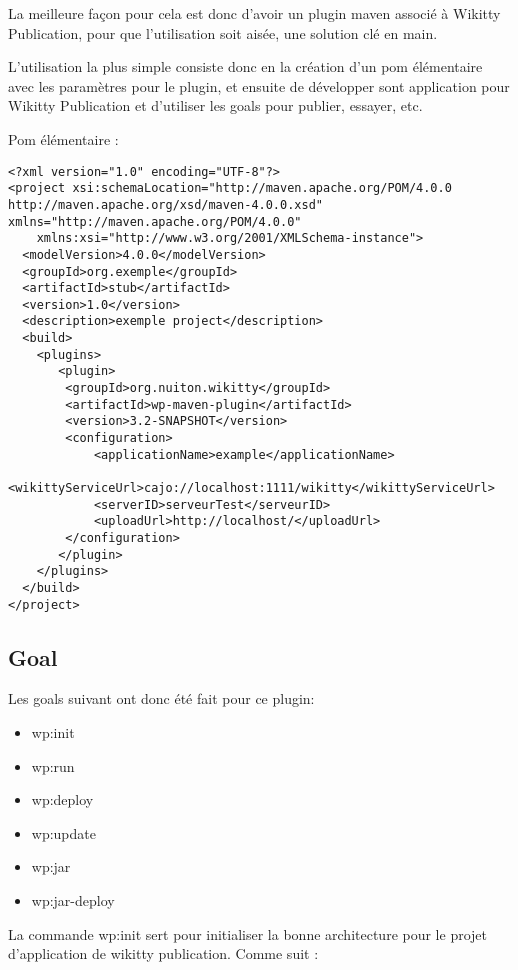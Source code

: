 La meilleure façon pour cela est donc d'avoir un plugin maven associé à 
Wikitty Publication, pour que l'utilisation soit aisée, une solution clé en 
main.

L'utilisation la plus simple consiste donc en la création d'un pom élémentaire
avec les paramètres pour le plugin, et ensuite de développer sont application
pour Wikitty Publication et d'utiliser les goals pour publier, essayer, etc.

Pom élémentaire :

\begin{lstlisting}
<?xml version="1.0" encoding="UTF-8"?>
<project xsi:schemaLocation="http://maven.apache.org/POM/4.0.0 http://maven.apache.org/xsd/maven-4.0.0.xsd" xmlns="http://maven.apache.org/POM/4.0.0"
    xmlns:xsi="http://www.w3.org/2001/XMLSchema-instance">
  <modelVersion>4.0.0</modelVersion>
  <groupId>org.exemple</groupId>
  <artifactId>stub</artifactId>
  <version>1.0</version>
  <description>exemple project</description>
  <build>
	<plugins>
	   <plugin>
		<groupId>org.nuiton.wikitty</groupId>
		<artifactId>wp-maven-plugin</artifactId>
		<version>3.2-SNAPSHOT</version>
		<configuration>
			<applicationName>example</applicationName>
			<wikittyServiceUrl>cajo://localhost:1111/wikitty</wikittyServiceUrl>
			<serverID>serveurTest</serveurID>
			<uploadUrl>http://localhost/</uploadUrl>
		</configuration>
	   </plugin>
	</plugins>
  </build>
</project>
\end{lstlisting}


\subsection{Goal}

Les goals suivant ont donc été fait pour ce plugin:

\begin{itemize}
\item wp:init
\item wp:run
\item wp:deploy
\item wp:update
\item wp:jar
\item wp:jar-deploy
\end{itemize}

La commande wp:init sert pour initialiser la bonne architecture pour le projet
d'application de wikitty publication. Comme suit :

